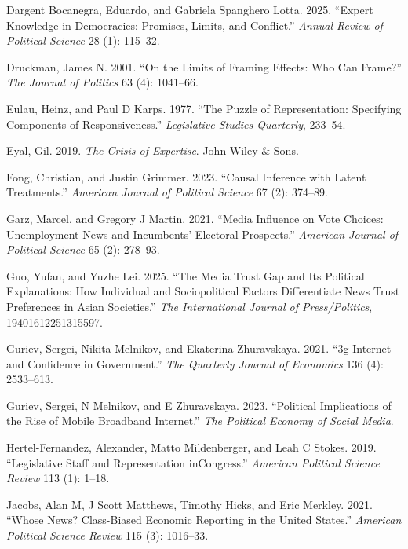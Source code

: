 \documentclass[
  12pt]{article}
\newlength{\cslhangindent}
\newenvironment{CSLReferences}[2] %
 {\begin{list}{}{%
  \setlength{\itemindent}{0pt}
  \setlength{\leftmargin}{0pt}
  \setlength{\parsep}{0pt}
  \ifodd #1
   \setlength{\leftmargin}{\cslhangindent}
   \setlength{\itemindent}{-1\cslhangindent}
  \fi
  \setlength{\itemsep}{#2\baselineskip}}}
 {\end{list}}
\begin{document}
\begin{CSLReferences}{1}{1}
Dargent Bocanegra, Eduardo, and Gabriela Spanghero Lotta. 2025.
{``Expert Knowledge in Democracies: Promises, Limits, and Conflict.''}
\emph{Annual Review of Political Science} 28 (1): 115--32.

Druckman, James N. 2001. {``On the Limits of Framing Effects: Who Can
Frame?''} \emph{The Journal of Politics} 63 (4): 1041--66.

Eulau, Heinz, and Paul D Karps. 1977. {``The Puzzle of Representation:
Specifying Components of Responsiveness.''} \emph{Legislative Studies
Quarterly}, 233--54.

Eyal, Gil. 2019. \emph{The Crisis of Expertise}. John Wiley \& Sons.

Fong, Christian, and Justin Grimmer. 2023. {``Causal Inference with
Latent Treatments.''} \emph{American Journal of Political Science} 67
(2): 374--89.

Garz, Marcel, and Gregory J Martin. 2021. {``Media Influence on Vote
Choices: Unemployment News and Incumbents' Electoral Prospects.''}
\emph{American Journal of Political Science} 65 (2): 278--93.

Guo, Yufan, and Yuzhe Lei. 2025. {``The Media Trust Gap and Its
Political Explanations: How Individual and Sociopolitical Factors
Differentiate News Trust Preferences in Asian Societies.''} \emph{The
International Journal of Press/Politics}, 19401612251315597.

Guriev, Sergei, Nikita Melnikov, and Ekaterina Zhuravskaya. 2021. {``3g
Internet and Confidence in Government.''} \emph{The Quarterly Journal of
Economics} 136 (4): 2533--613.

Guriev, Sergei, N Melnikov, and E Zhuravskaya. 2023. {``Political
Implications of the Rise of Mobile Broadband Internet.''} \emph{The
Political Economy of Social Media}.

Hertel-Fernandez, Alexander, Matto Mildenberger, and Leah C Stokes.
2019. {``Legislative Staff and Representation inCongress.''}
\emph{American Political Science Review} 113 (1): 1--18.

Jacobs, Alan M, J Scott Matthews, Timothy Hicks, and Eric Merkley. 2021.
{``Whose News? Class-Biased Economic Reporting in the United States.''}
\emph{American Political Science Review} 115 (3): 1016--33.


\end{CSLReferences}
\end{document}
